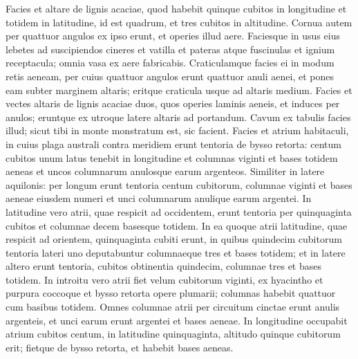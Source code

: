 \begin{biblechapter}
\begin{biblechapter}
\begin{biblechapter}
\begin{biblechapter}
\begin{biblechapter}
\begin{biblechapter}
\begin{biblechapter}
\begin{biblechapter}
\begin{biblechapter}
\begin{biblechapter}
\begin{biblechapter}
\begin{biblechapter}
\begin{biblechapter}
\begin{biblechapter}
\begin{biblechapter}
\begin{biblechapter}
\begin{biblechapter}
\begin{biblechapter}
\begin{biblechapter}
\begin{biblechapter}
\begin{biblechapter}
\begin{biblechapter}
\begin{biblechapter}
\begin{biblechapter}
\begin{biblechapter}
\begin{biblechapter}
\begin{biblechapter}
\verse Facies et altare de lignis acaciae, quod habebit quinque cubitos in longitudine et totidem in latitudine, id est quadrum, et tres cubitos in altitudine. 
\verse Cornua autem per quattuor angulos ex ipso erunt, et operies illud aere. 
\verse Faciesque in usus eius lebetes ad suscipiendos cineres et vatilla et pateras atque fuscinulas et ignium receptacula; omnia vasa ex aere fabricabis. 
\verse Craticulamque facies ei in modum retis aeneam, per cuius quattuor angulos erunt quattuor anuli aenei, 
\verse et pones eam subter marginem altaris; eritque craticula usque ad altaris medium. 
\verse Facies et vectes altaris de lignis acaciae duos, quos operies laminis aeneis, 
\verse et induces per anulos; eruntque ex utroque latere altaris ad portandum. 
\verse Cavum ex tabulis facies illud; sicut tibi in monte monstratum est, sic facient.
 \verse Facies et atrium habitaculi, in cuius plaga australi contra meridiem erunt tentoria de bysso retorta: centum cubitos unum latus tenebit in longitudine 
 \verse et columnas viginti et bases totidem aeneas et uncos columnarum anulosque earum argenteos. 
\verse Similiter in latere aquilonis: per longum erunt tentoria centum cubitorum, columnae viginti et bases aeneae eiusdem numeri et unci columnarum anulique earum argentei. 
\verse In latitudine vero atrii, quae respicit ad occidentem, erunt tentoria per quinquaginta cubitos et columnae decem basesque totidem. 
\verse In ea quoque atrii latitudine, quae respicit ad orientem, quinquaginta cubiti erunt, 
\verse in quibus quindecim cubitorum tentoria lateri uno deputabuntur columnaeque tres et bases totidem; 
\verse et in latere altero erunt tentoria, cubitos obtinentia quindecim, columnae tres et bases totidem. 
\verse In introitu vero atrii fiet velum cubitorum viginti, ex hyacintho et purpura coccoque et bysso retorta opere plumarii; columnas habebit quattuor cum basibus totidem. 
\verse Omnes columnae atrii per circuitum cinctae erunt anulis argenteis, et unci earum erunt argentei et bases aeneae. 
\verse In longitudine occupabit atrium cubitos centum, in latitudine quinquaginta, altitudo quinque cubitorum erit; fietque de bysso retorta, et habebit bases aeneas. 

\end{biblechapter}
\end{biblechapter}
\end{biblechapter}
\end{biblechapter}
\end{biblechapter}
\end{biblechapter}
\end{biblechapter}
\end{biblechapter}
\end{biblechapter}
\end{biblechapter}
\end{biblechapter}
\end{biblechapter}
\end{biblechapter}
\end{biblechapter}
\end{biblechapter}
\end{biblechapter}
\end{biblechapter}
\end{biblechapter}
\end{biblechapter}
\end{biblechapter}
\end{biblechapter}
\end{biblechapter}
\end{biblechapter}
\end{biblechapter}
\end{biblechapter}
\end{biblechapter}
\end{biblechapter}
